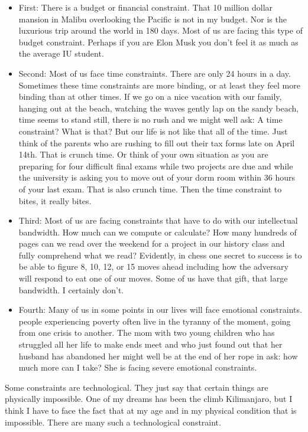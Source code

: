 \documentclass[
]{book}
\begin{document}
\begin{itemize}
\item
  First: There is a budget or financial constraint. That 10 million dollar mansion in Malibu overlooking the Pacific is not in my budget. Nor is the luxurious trip around the world in 180 days. Most of us are facing this type of budget constraint. Perhaps if you are Elon Musk you don't feel it as much as the average IU student.
\item
  Second: Most of us face time constraints. There are only 24 hours in a day. Sometimes these time constraints are more binding, or at least they feel more binding than at other times. If we go on a nice vacation with our family, hanging out at the beach, watching the waves gently lap on the sandy beach, time seems to stand still, there is no rush and we might well ask: A time constraint? What is that? But our life is not like that all of the time. Just think of the parents who are rushing to fill out their tax forms late on April 14th. That is crunch time. Or think of your own situation as you are preparing for four difficult final exams while two projects are due and while the university is asking you to move out of your dorm room within 36 hours of your last exam. That is also crunch time. Then the time constraint to bites, it really bites.
\item
  Third: Most of us are facing constraints that have to do with our intellectual bandwidth. How much can we compute or calculate? How many hundreds of pages can we read over the weekend for a project in our history class and fully comprehend what we read? Evidently, in chess one secret to success is to be able to figure 8, 10, 12, or 15 moves ahead including how the adversary will respond to eat one of our moves. Some of us have that gift, that large bandwidth. I certainly don't.
\item
  Fourth: Many of us in some points in our lives will face emotional constraints. people experiencing poverty often live in the tyranny of the moment, going from one crisis to another. The mom with two young children who has struggled all her life to make ends meet and who just found out that her husband has abandoned her might well be at the end of her rope in ask: how much more can I take? She is facing severe emotional constraints.
\end{itemize}

Some constraints are technological. They just say that certain things are physically impossible. One of my dreams has been the climb Kilimanjaro, but I think I have to face the fact that at my age and in my physical condition that is impossible. There are many such a technological constraint.
\end{document}
